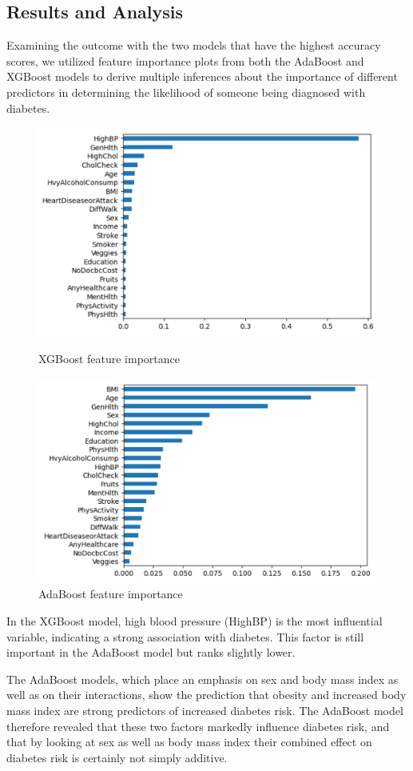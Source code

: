 \documentclass[12pt]{article}
\begin{document}
\subsection{Results and Analysis}
Examining the outcome with the two models that have the highest accuracy scores, we utilized feature importance plots from both the AdaBoost and XGBoost models to derive multiple inferences about the importance of different predictors in determining the likelihood of someone being diagnosed with diabetes.
\begin{figure}[H]
  \centering
  \begin{minipage}[b]{0.45\textwidth}
    \centering
    \includegraphics[width=0.7\linewidth]{xgboost_w.png}
    \caption{XGBoost feature importance}
  \end{minipage}\hfill
  \begin{minipage}[b]{0.45\textwidth}
    \centering
    \includegraphics[width=0.7\linewidth]{adaboost_w.png}
    \caption{AdaBoost feature importance}
  \end{minipage}
\end{figure}
In the XGBoost model, high blood pressure (HighBP) is the most influential variable,
indicating a strong association with diabetes. This factor is still important in the AdaBoost model but ranks slightly lower. 

The AdaBoost models, which place an emphasis on sex and body mass index as well as on their interactions, show the prediction that obesity and increased body mass index are strong predictors of increased diabetes risk. The AdaBoost model therefore revealed that these two factors markedly influence diabetes risk, and that by looking at sex as well as body mass index their combined effect on diabetes risk is certainly not simply additive.
\end{document}
